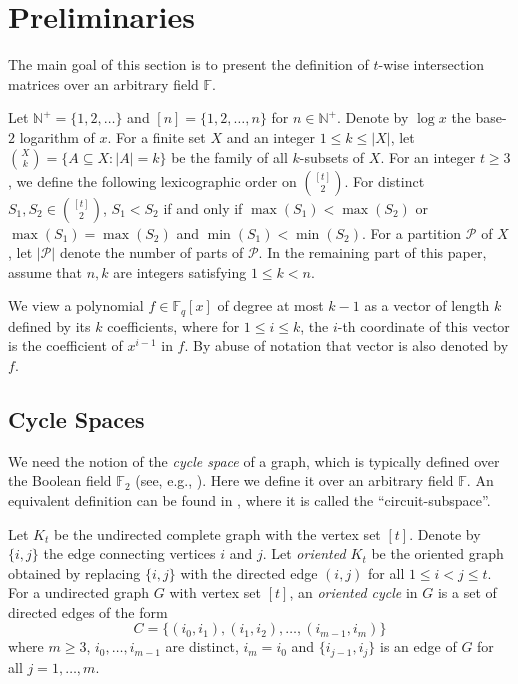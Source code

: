 \documentclass[11pt]{article}
\newcommand\black[1]{{\color{black} #1}}
\newcommand{\N}{{\mathbb{N}}}
\begin{document}
\section{Preliminaries}\label{preliminaries}

The main goal of this section is to present the definition of $t$-wise intersection matrices over an arbitrary field $\mathbb{F}$.

Let $\N^+=\{1,2,\dots\}$ and $[n]=\{1,2,\dots, n\}$ for $n\in\N^+$. Denote by $\log x$  the base-$2$ logarithm of $x$. For a finite set $X$ and an integer $1\le k\le |X|$, let $\binom{X}{k}=\{A\subseteq X:|A|=k\}$ be the family of all $k$-subsets of $X$. For an integer $t\ge 3$, we define the following lexicographic order on $\binom{[t]}{2}$. For distinct $S_1,S_2 \in\binom{[t]}{2}$, $S_1< S_2$ if and only if $\max(S_1)<\max(S_2)$ or $\max(S_1)=\max(S_2)$ and $\min(S_1)<\min(S_2)$.
For a partition $\mathcal{P}$ of $X$, let $|\mathcal{P}|$ denote the number of parts of $\mathcal{P}$.
In the remaining part of this paper, assume that $n,k$ are integers satisfying $1\le k<n$.

We view a polynomial $f\in\mathbb{F}_q[x]$ of degree at most $k-1$ as a vector of length $k$ defined by its $k$ coefficients, where for $1\le i\le k$, the $i$-th coordinate of this vector is the coefficient of $x^{i-1}$ in $f$. By abuse of notation that vector is also denoted by $f$.

\subsection{Cycle Spaces}
We need the notion of the {\it cycle space} of a graph, which is typically defined over the Boolean field $\mathbb{F}_2$ (see, e.g.,  \cite{diestel2017graphentheory}). Here we define it over an arbitrary field $\mathbb{F}$. An equivalent definition can be found in \cite{BBNN93}, where it is called the ``circuit-subspace''.

Let $K_t$ be the undirected complete graph with the vertex set $[t]$. Denote by  $\{i,j\}$  the edge connecting vertices $i$ and $j$. Let %
\black{{\it oriented $K_t$}}
be the oriented graph obtained by replacing $\{i,j\}$ with the directed edge $(i,j)$ for all $1\le i < j\le t$.
For a \black{undirected} graph $G$ with vertex set $[t]$, an {\it oriented cycle} in $G$ is a set of directed edges of the form
\[
C=\{(i_0, i_1), (i_1, i_2), \dots, (i_{m-1}, i_m)\}
\]
 where $m\geq 3$, $i_0,\dots,i_{m-1}$ are distinct, $i_m=i_0$ and $\{i_{j-1}, i_j\}$ is an edge of $G$ for all $j=1,\dots,m$.
\end{document}
